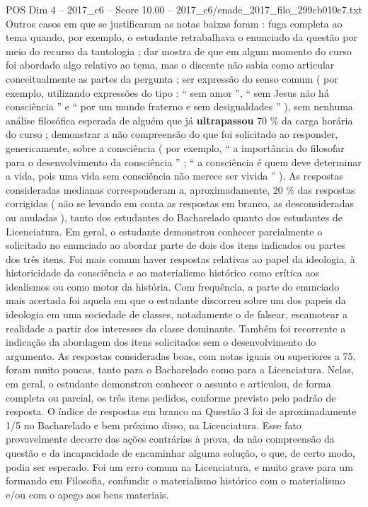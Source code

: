 \begin{textsample}{POS Dim 4 – 2017\_c6 – Score 10.00 – 2017\_c6/enade\_2017\_filo\_299cb010c7.txt}
Outros casos em que se justificaram as notas baixas foram : fuga completa ao tema quando, por exemplo, o estudante retrabalhava o enunciado da questão por meio do recurso da tautologia ; dar mostra de que em algum momento do curso foi abordado algo relativo ao tema, mas o discente não sabia como articular conceitualmente as partes da pergunta ; ser expressão do senso comum ( por exemplo, utilizando expressões do tipo : “ sem amor ”, “ sem Jesus não há consciência ” e “ por um mundo fraterno e sem desigualdades ” ), sem nenhuma análise filosófica esperada de alguém que já \textbf{ultrapassou} 70 \% da carga horária do curso ; demonstrar a não compreensão do que foi solicitado ao responder, genericamente, sobre a consciência ( por exemplo, “ a importância do filosofar para o desenvolvimento da consciência ” ; “ a consciência é quem deve determinar a vida, pois uma vida sem consciência não merece ser vivida ” ).
As respostas consideradas medianas corresponderam a, aproximadamente, 20 \% das respostas corrigidas ( não se levando em conta as respostas em branco, as desconsideradas ou anuladas ), tanto dos estudantes do Bacharelado quanto dos estudantes de Licenciatura.
Em geral, o estudante demonstrou conhecer parcialmente o solicitado no enunciado ao abordar parte de dois dos itens indicados ou partes dos três itens.
Foi mais comum haver respostas relativas ao papel da ideologia, à historicidade da consciência e ao materialismo histórico como crítica aos idealismos ou como motor da história.
Com frequência, a parte do enunciado mais acertada foi aquela em que o estudante discorreu sobre um dos papeis da ideologia em uma sociedade de classes, notadamente o de falsear, escamotear a realidade a partir dos interesses da classe dominante.
Também foi recorrente a indicação da abordagem dos itens solicitados sem o desenvolvimento do argumento.
As respostas consideradas boas, com notas iguais ou superiores a 75, foram muito poucas, tanto para o Bacharelado como para a Licenciatura.
Nelas, em geral, o estudante demonstrou conhecer o assunto e articulou, de forma completa ou parcial, os três itens pedidos, conforme previsto pelo padrão de resposta.
O índice de respostas em branco na Questão 3 foi de aproximadamente 1/5 no Bacharelado e bem próximo disso, na Licenciatura.
Esse fato provavelmente decorre das ações contrárias à prova, da não compreensão da questão e da incapacidade de encaminhar alguma solução, o que, de certo modo, podia ser esperado.
Foi um erro comum na Licenciatura, e muito grave para um formando em Filosofia, confundir o materialismo histórico com o materialismo e/ou com o apego aos bens materiais.

\end{textsample}
